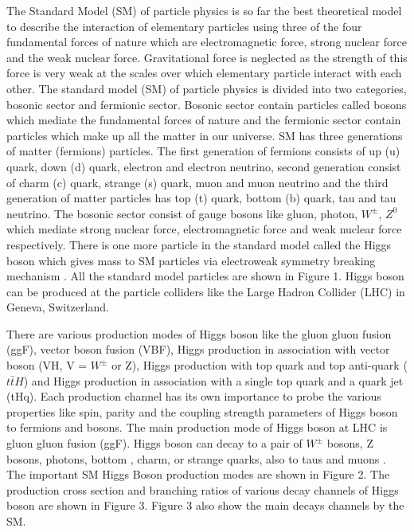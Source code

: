 \documentclass[final,3p]{CSP}
\begin{document}
\onehalfspacing The Standard Model (SM) of particle physics is so far the best theoretical model to describe the interaction of elementary 
particles using three of the four fundamental forces of nature which are electromagnetic force, strong nuclear force and the 
weak nuclear force. Gravitational force is neglected as the strength of this force is very weak at the scales over which 
elementary particle interact with each other. The standard model (SM) of particle physics is divided into two categories, 
bosonic sector and fermionic sector. Bosonic sector contain particles called bosons which mediate the fundamental forces of 
nature and the fermionic sector contain particles which make up all the matter in our universe. SM has three 
generations of matter (fermions) particles. The first generation of fermions consists of up (u) quark, down (d) quark, electron 
and electron neutrino, second generation consist of charm (c) quark, strange (s) quark, muon and muon neutrino and the third 
generation of matter particles has top (t) quark, bottom (b) quark, tau and tau neutrino. The bosonic sector consist of gauge 
bosons like gluon, photon, $W^{\pm}$, $Z^0$ which mediate strong nuclear force, electromagnetic force and weak nuclear force respectively.
There is one more particle in the standard model called the Higgs boson which gives mass to SM particles via electroweak symmetry breaking mechanism \cite{Chatrchyan:2012xdj}. All the standard model particles are shown in Figure 1. Higgs boson can be produced at the particle colliders like the Large Hadron Collider (LHC) in Geneva, Switzerland.


There are various production modes of Higgs boson like the gluon gluon fusion (ggF), vector boson fusion (VBF), Higgs 
production in association with vector boson (VH, V = $W^{\pm}$ or Z), Higgs production with top quark and top anti-quark ($t\bar{t}H$) and Higgs 
production in association with a single top quark and a quark jet (tHq). Each production channel has its own importance to probe the 
various properties like spin, parity and the coupling strength parameters of Higgs boson to fermions and bosons.
The main production mode of Higgs boson at LHC is gluon gluon fusion (ggF).
Higgs boson can decay to a pair of $W^{\pm}$ bosons, Z bosons, photons, bottom , charm, or strange quarks, also to taus and muons .
The important SM Higgs Boson production modes are shown in Figure 2. The production cross section and branching ratios of various decay channels of Higgs boson are shown in Figure 3.
Figure 3 also show the main decays channels by the SM.
\end{document}
